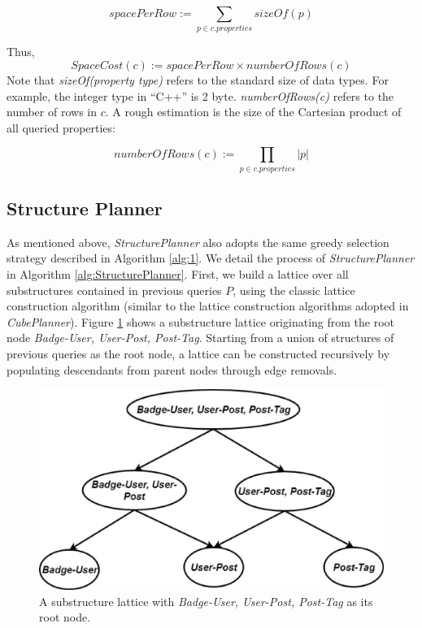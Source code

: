 \begin{displaymath}
spacePerRow:=
\displaystyle{\sum_{p\in c.properties}sizeOf(p)}
\end{displaymath}

\noindent Thus,
\begin{displaymath}
SpaceCost(c):= spacePerRow \times numberOfRows(c)
\end{displaymath}
Note that \textit{sizeOf(property type)} refers to the standard size of data types. For example, the integer type in ``C++'' is 2 byte. \textit{numberOfRows(c)} refers to the number of rows in $c$. A rough estimation is the size of the Cartesian product of all queried properties:

\begin{displaymath}
numberOfRows(c):= \displaystyle{\prod_{p\in c.properties}|p|}
\end{displaymath}


\subsection{Structure Planner}
\label{Structure Planner}
As mentioned above, \emph{StructurePlanner} also adopts the same greedy selection strategy described in Algorithm \ref{alg:1}. We detail the process of \emph{StructurePlanner} in Algorithm \ref{alg:StructurePlanner}. First, we build a lattice over all substructures contained in previous queries $P$, using the classic lattice construction algorithm (similar to the lattice construction algorithms adopted in \emph{CubePlanner}). Figure \ref{fig:4:3} shows a substructure lattice originating from the root node \textit{Badge-User, User-Post, Post-Tag}. Starting from a union of structures of previous queries as the root node, a lattice can be constructed recursively by populating descendants from parent nodes through edge removals.

\begin {figure}[H]
\centering
\includegraphics[scale=0.4]{pic/Structurelattice.eps}
\caption{A substructure lattice with \textit{Badge-User, User-Post, Post-Tag} as its root node.}
\label{fig:4:3}
\end{figure}


